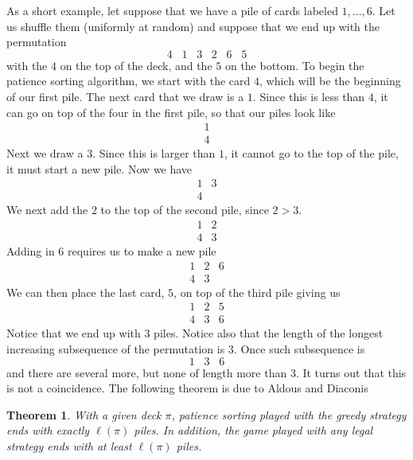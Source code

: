 \documentclass[12pt]{report}
\newtheorem{thm}{Theorem}[section]
\theoremstyle{definition}
\begin{document}
As a short example, let suppose that we have a pile of cards labeled $1,\dots,6$.  Let us shuffle them (uniformly at random) and suppose that we end up with the permutation $$4\;\;\;1\;\;\;3\;\;\;2\;\;\;6\;\;\;5$$ with the $4$ on the top of the deck, and the $5$ on the bottom.  To begin the patience sorting algorithm, we start with the card $4$, which will be the beginning of our first pile.  The next card that we draw is a $1$.  Since this is less than $4$, it can go on top of the four in the first pile, so that our piles look like 
$$
\begin{array}{c}
1 \\
4
\end{array}
$$
Next we draw a $3$.  Since this is larger than $1$, it cannot go to the top of the pile, it must start a new pile.  Now we have 
$$
\begin{array}{ccc}
1 & 3 \\
4 &
\end{array}
$$
We next add the $2$ to the top of the second pile, since $2>3$.  
$$
\begin{array}{ccc}
1 & 2 \\
4 & 3
\end{array}
$$
Adding in $6$ requires us to make a new pile
$$
\begin{array}{ccc}
1 & 2 & 6 \\
4 & 3 & 
\end{array}
$$
We can then place the last card, $5$, on top of the third pile giving us 
$$
\begin{array}{ccc}
1 & 2 & 5 \\
4 & 3 & 6
\end{array}
$$
Notice that we end up with $3$ piles.  Notice also that the length of the longest increasing subsequence of the permutation is $3$.  Once such subsequence is 
$$
1 \; \; \; 3 \; \; \; 6
$$
and there are several more, but none of length more than $3$.  It turns out that this is not a coincidence.  The following theorem is due to Aldous and Diaconis \cite{AldousDiaconis}
\begin{thm}
With a given deck $\pi$, patience sorting played with the greedy strategy ends with exactly $\ell(\pi)$ piles.  In addition, the game played with any legal strategy ends with at least $\ell(\pi)$ piles.  
\end{thm}
\end{document}
